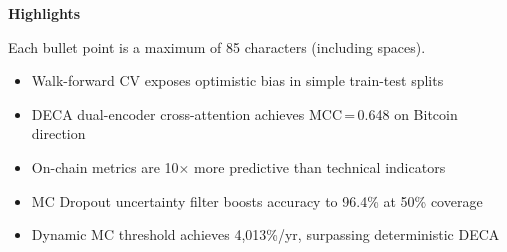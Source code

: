 \documentclass{article}
\begin{document}
\noindent\textbf{Highlights}

\bigskip
\noindent Each bullet point is a maximum of 85 characters (including spaces).

\begin{itemize}
  \item Walk-forward CV exposes optimistic bias in simple train-test splits           %
  \item DECA dual-encoder cross-attention achieves MCC\,=\,0.648 on Bitcoin direction %
  \item On-chain metrics are 10$\times$ more predictive than technical indicators     %
  \item MC Dropout uncertainty filter boosts accuracy to 96.4\% at 50\% coverage      %
  \item Dynamic MC threshold achieves 4{,}013\%/yr, surpassing deterministic DECA     %
\end{itemize}
\end{document}
